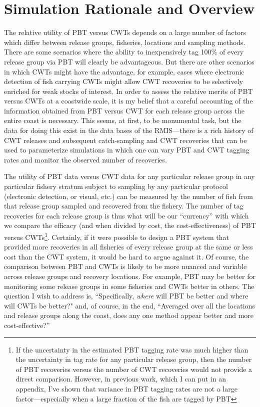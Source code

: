 \documentclass[11pt]{article}
\begin{document}
\section{Simulation Rationale and Overview}

The relative utility of PBT versus CWTs depends on a large
number of factors which differ between release groups, fisheries, locations and sampling methods.
There are some scenarios where the ability to inexpensively tag 100\% of every release group via PBT
will clearly be advantageous. But there are other scenarios in which CWTs might have the advantage, for example,
cases where electronic detection of fish carrying CWTs
might allow CWT recoveries to be selectively enriched for weak stocks of interest.  In order to assess the relative merits of PBT versus CWTs at a coastwide
scale, it is my belief that a careful accounting of the information obtained from PBT versus
CWT for each release group across the entire coast is necessary.  This seems, at first, to be  monumental
task, but the data for doing this exist in the data bases of the RMIS---there is a rich history of
CWT releases and subsequent catch-sampling and CWT recoveries that can be used to parameterize simulations
in which one can vary PBT and CWT tagging rates and monitor the observed number of recoveries.



The utility of PBT data versus CWT data for any particular release group in any 
particular fishery stratum subject to sampling by any particular protocol (electronic detection, or 
visual, etc.) can be measured by the number of fish from that release group sampled and
recovered from the fishery.  The number of tag recoveries for each release group is thus what
will be our ``currency'' with which we compare the efficacy (and when divided by cost, the cost-effectiveness)
of PBT versus CWTs\footnote{If the uncertainty in the estimated PBT tagging rate was much higher than the
uncertainty in tag rate for any particular release group, then the number of PBT recoveries versus the number of CWT recoveries
would not provide a direct comparison.  However, in previous work, which I can put in an appendix, I've shown
that variance in PBT tagging rates are not a large factor---especially when a large fraction of the fish are
tagged by PBT}.  Certainly, if it were possible to design a PBT system that provided more recoveries
in all fisheries of every release group at the same or less cost than the CWT system, it would be
hard to argue against it.  Of course, the comparison between PBT and CWTs is likely to be
more nuanced and variable across release groups and recovery locations.  For example, PBT may be better
for monitoring some release groups in some fisheries and CWTs better in others. The question I wish to address is,
``Specifically, {\em where} will PBT be better and where will CWTs be better?" and, of course, in the end,
``Averaged over all the locations and release groups along the coast, does any one method appear
better and more cost-effective?''  
\end{document}
